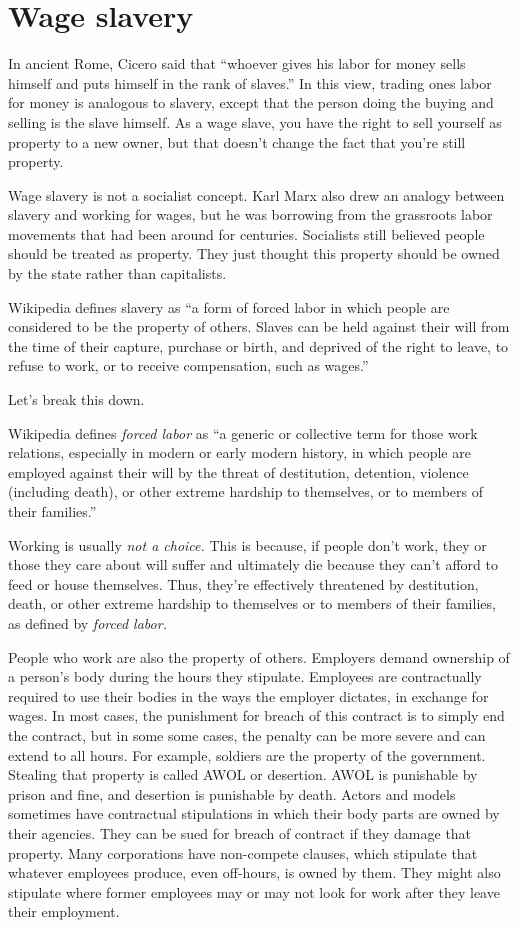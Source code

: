 \section{Wage slavery}
In ancient Rome, Cicero said that ``whoever gives his labor for money sells himself and puts himself in the rank of slaves.'' In this view, trading ones labor for money is analogous to slavery, except that the person doing the buying and selling is the slave himself. As a wage slave, you have the right to sell yourself as property to a new owner, but that doesn't change the fact that you're still property.

Wage slavery is not a socialist concept. Karl Marx also drew an analogy between slavery and working for wages, but he was borrowing from the grassroots labor movements that had been around for centuries. Socialists still believed people should be treated as property. They just thought this property should be owned by the state rather than capitalists.

Wikipedia defines slavery as ``a form of forced labor in which people are considered to be the property of others. Slaves can be held against their will from the time of their capture, purchase or birth, and deprived of the right to leave, to refuse to work, or to receive compensation, such as wages.''\cite{wikipedia-slavery}

Let's break this down.

Wikipedia defines \emph{forced labor} as ``a generic or collective term for those work relations, especially in modern or early modern history, in which people are employed against their will by the threat of destitution, detention, violence (including death), or other extreme hardship to themselves, or to members of their families.''\cite{wikipedia-forced-labor}

Working is usually \emph{not a choice.} This is because, if people don't work, they or those they care about will suffer and ultimately die because they can't afford to feed or house themselves. Thus, they're effectively threatened by destitution, death, or other extreme hardship to themselves or to members of their families, as defined by \emph{forced labor.}

People who work are also the property of others. Employers demand ownership of a person's body during the hours they stipulate. Employees are contractually required to use their bodies in the ways the employer dictates, in exchange for wages. In most cases, the punishment for breach of this contract is to simply end the contract, but in some some cases, the penalty can be more severe and can extend to all hours. For example, soldiers are the property of the government. Stealing that property is called AWOL or desertion. AWOL is punishable by prison and fine, and desertion is punishable by death. Actors and models sometimes have contractual stipulations in which their body parts are owned by their agencies. They can be sued for breach of contract if they damage that property. Many corporations have non-compete clauses, which stipulate that whatever employees produce, even off-hours, is owned by them. They might also stipulate where former employees may or may not look for work after they leave their employment.

